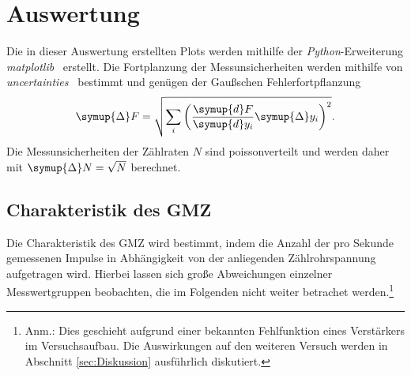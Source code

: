 \section{Auswertung}
\label{sec:Auswertung}
Die in dieser Auswertung erstellten Plots werden mithilfe der \textit{Python}-Erweiterung 
\textit{matplotlib}~\cite{matplotlib} erstellt. Die Fortplanzung der Messunsicherheiten werden mithilfe von
\textit{uncertainties}~\cite{uncertainties} bestimmt und genügen der Gaußschen Fehlerfortpflanzung
\begin{equation}
    \symup{\Delta} F = \sqrt{\sum_{i}\left(\frac{\symup{d}F}{\symup{d}y_{i}}\symup{\Delta} y_{i} \right)^2}.
    \label{eq:Gauss}
\end{equation}
Die Messunsicherheiten der Zählraten $N$ sind poissonverteilt und werden daher mit $\symup{\Delta}N = \sqrt{N}$ berechnet.

\subsection{Charakteristik des GMZ}
Die Charakteristik des GMZ wird bestimmt, indem die Anzahl der pro Sekunde gemessenen Impulse in Abhängigkeit
von der anliegenden Zählrohrspannung aufgetragen wird. Hierbei lassen sich große Abweichungen einzelner Messwertgruppen
beobachten, die im Folgenden nicht weiter betrachet werden.\footnote{Anm.: Dies geschieht aufgrund einer bekannten Fehlfunktion
eines Verstärkers im Versuchsaufbau. Die Auswirkungen auf den weiteren Versuch werden in Abschnitt \ref{sec:Diskussion}
ausführlich diskutiert.}

